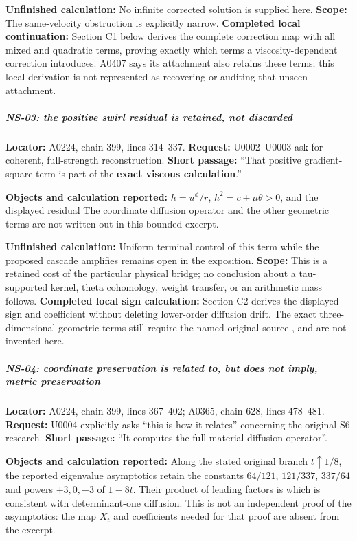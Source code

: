\textbf{Unfinished calculation:} No infinite corrected solution is
supplied here. \textbf{Scope:} The same-velocity obstruction is
explicitly narrow. \textbf{Completed local continuation:} Section C1
below derives the complete correction map with all mixed and quadratic
terms, proving exactly which terms a viscosity-dependent correction
introduces. A0407 says its attachment also retains these terms; this
local derivation is not represented as recovering or auditing that
unseen attachment.

\subparagraph{NS-03: the positive swirl residual is retained, not
discarded}\label{ns-03-the-positive-swirl-residual-is-retained-not-discarded}

\textbf{Locator:} A0224, chain 399, lines 314--337. \textbf{Request:}
U0002--U0003 ask for coherent, full-strength reconstruction.
\textbf{Short passage:} ``That positive gradient-square term is part of
the \textbf{exact viscous calculation}.''

\textbf{Objects and calculation reported:} \(h=u^\phi/r\),
\(h^2=c+\mu\theta>0\), and the displayed residual  The coordinate diffusion operator and the other geometric terms are
not written out in this bounded excerpt.

\textbf{Unfinished calculation:} Uniform terminal control of this term
while the proposed cascade amplifies remains open in the exposition.
\textbf{Scope:} This is a retained cost of the particular physical
bridge; no conclusion about a tau-supported kernel, theta cohomology,
weight transfer, or an arithmetic mass follows. \textbf{Completed local
sign calculation:} Section C2 derives the displayed sign and coefficient
without deleting lower-order diffusion drift. The exact
three-dimensional geometric terms still require the named original
source \protect{}, and are not invented
here.

\subparagraph{NS-04: coordinate preservation is related to, but does not
imply, metric
preservation}\label{ns-04-coordinate-preservation-is-related-to-but-does-not-imply-metric-preservation}

\textbf{Locator:} A0224, chain 399, lines 367--402; A0365, chain 628,
lines 478--481. \textbf{Request:} U0004 explicitly asks ``this is how it
relates'' concerning the original S6 research. \textbf{Short passage:}
``It computes the full material diffusion operator''.

\textbf{Objects and calculation reported:}  Along the stated original branch \(t\uparrow1/8\), the reported
eigenvalue asymptotics retain the constants \(64/121\), \(121/337\),
\(337/64\) and powers \(+3,0,-3\) of \(1-8t\). Their product of leading
factors is  which is consistent with determinant-one diffusion. This is not an
independent proof of the asymptotics: the map \(X_t\) and coefficients
needed for that proof are absent from the excerpt.

